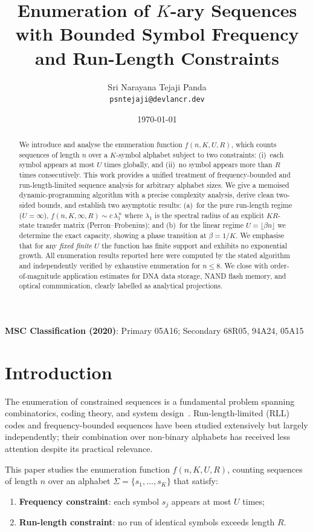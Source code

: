 \documentclass[a4paper,12pt]{article}
\title{Enumeration of $K$-ary Sequences with Bounded Symbol Frequency
       and Run-Length Constraints}
\author{Sri Narayana Tejaji Panda\\
\small \texttt{psntejaji@devlancr.dev}}
\date{\today}
\begin{document}
\maketitle

\noindent
\textbf{MSC Classification (2020)}: Primary 05A16; Secondary 68R05, 94A24, 05A15

\begin{abstract}
We introduce and analyse the enumeration function $f(n, K, U, R)$,
which counts sequences of length $n$ over a $K$-symbol alphabet
subject to two constraints: (i)~each symbol appears at most $U$ times
globally, and (ii)~no symbol appears more than $R$ times consecutively.
This work provides a unified treatment of frequency-bounded and
run-length-limited sequence analysis for arbitrary alphabet sizes.
We give a memoised dynamic-programming algorithm with a precise
complexity analysis, derive clean two-sided bounds, and establish two
asymptotic results: (a)~for the pure run-length regime ($U=\infty$),
$f(n,K,\infty,R)\sim c\,\lambda_1^{\,n}$ where $\lambda_1$ is the
spectral radius of an explicit $KR$-state transfer matrix
(Perron--Frobenius); and (b)~for the linear regime $U=\lfloor\beta
n\rfloor$ we determine the exact capacity, showing a phase transition
at $\beta=1/K$.  We emphasise that for any \emph{fixed finite} $U$ the
function has finite support and exhibits no exponential growth.  All
enumeration results reported here were computed by the stated
algorithm and independently verified by exhaustive enumeration for
$n\le 8$.  We close with order-of-magnitude application estimates for
DNA data storage, NAND flash memory, and optical communication,
clearly labelled as analytical projections.
\end{abstract}

\section{Introduction}

The enumeration of constrained sequences is a fundamental problem
spanning combinatorics, coding theory, and system design~\cite{cover2006}.
Run-length-limited (RLL) codes and frequency-bounded sequences have
been studied extensively but largely independently; their combination
over non-binary alphabets has received less attention despite its
practical relevance.

This paper studies the enumeration function $f(n, K, U, R)$, counting
sequences of length $n$ over an alphabet $\Sigma = \{s_1,\ldots,s_K\}$
that satisfy:
\begin{enumerate}
    \item \textbf{Frequency constraint}: each symbol $s_j$ appears at
          most $U$ times;
    \item \textbf{Run-length constraint}: no run of identical symbols
          exceeds length $R$.
\end{enumerate}
\end{document}
